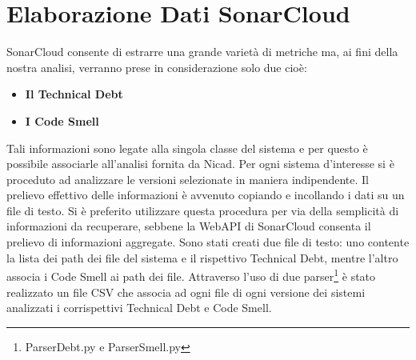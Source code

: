 \section{Elaborazione Dati SonarCloud}
SonarCloud consente di estrarre una grande varietà di metriche ma, ai fini della nostra analisi, verranno prese in considerazione solo due cioè:
\begin{itemize}
	\item \textbf{Il Technical Debt} 
	\item \textbf{I Code Smell}
\end{itemize}
Tali informazioni sono legate alla singola classe del sistema e per questo è possibile associarle all'analisi fornita da Nicad. Per ogni sistema d'interesse si è proceduto ad analizzare le versioni selezionate in maniera indipendente. Il prelievo effettivo delle informazioni è avvenuto copiando e incollando i dati su un file di testo. Si è preferito utilizzare questa procedura per via della semplicità di informazioni da recuperare, sebbene la WebAPI di SonarCloud consenta il prelievo di informazioni aggregate.
Sono stati creati due file di testo: uno contente la lista dei path dei file del sistema e il rispettivo Technical Debt, mentre l'altro associa i Code Smell ai path dei file. Attraverso l'uso di due parser\footnote{ParserDebt.py e ParserSmell.py} è stato realizzato un file CSV che associa ad ogni file di ogni versione dei sistemi analizzati i corrispettivi Technical Debt e Code Smell.